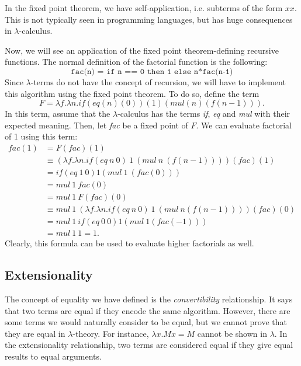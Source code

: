 \documentclass[a4paper, openany]{memoir}
\theoremstyle{definition}
\begin{document}
    In the fixed point theorem, we have self-application, i.e. subterms of the form $xx$. This is not typically seen in programming languages, but has huge consequences in $\lambda$-calculus.

    Now, we will see an application of the fixed point theorem-defining recursive functions. The normal definition of the factorial function is the following:
    \[\texttt{fac(n) = if n == 0 then 1 else n*fac(n-1)}\]
    Since $\lambda$-terms do not have the concept of recursion, we will have to implement this algorithm using the fixed point theorem. To do so, define the term
    \[F = \lambda f.\lambda n.\textit{if} (\textit{eq}(n)(0)) (1) (\textit{mul}(n)(f(n-1))).\]
    In this term, assume that the $\lambda$-calculus has the terms \textit{if}, \textit{eq} and \textit{mul} with their expected meaning. Then, let \textit{fac} be a fixed point of $F$. We can evaluate factorial of 1 using this term:
    \begin{align*}
        \textit{fac}(1) &= F(\textit{fac})(1) \\
        &\equiv (\lambda f.\lambda n.\textit{if} (\textit{eq} \ n \ 0) \ 1 \ (\textit{mul} \ n \ (f(n-1))))(\textit{fac})(1) \\
        &= \textit{if} (\textit{eq} \ 1 \ 0) 1 (\textit{mul} \ 1 \ (\textit{fac}(0))) \\
        &= \textit{mul} \ 1 \ \textit{fac}(0) \\
        &= \textit{mul} \ 1 \ F(\textit{fac})(0) \\
        &\equiv \textit{mul} \ 1 \ (\lambda f.\lambda n.\textit{if} (\textit{eq} \ n \ 0) \ 1 \ (\textit{mul} \ n (f(n-1))))(\textit{fac})(0) \\
        &= \textit{mul} \ 1 \ \textit{if} (\textit{eq} \ 0 \ 0) 1 (\textit{mul} \ 1 (\textit{fac}(-1)))  \\
        &= \textit{mul} \ 1 \ 1 = 1.
    \end{align*}
    \noindent Clearly, this formula can be used to evaluate higher factorials as well.
    
    \subsection{Extensionality}
    The concept of equality we have defined is the \emph{convertibility} relationship. It says that two terms are equal if they encode the same algorithm. However, there are some terms we would naturally consider to be equal, but we cannot prove that they are equal in $\lambda$-theory. For instance, $\lambda x.Mx = M$ cannot be shown in $\lambda$. In the extensionality relationship, two terms are considered equal if they give equal results to equal arguments.
\end{document}
